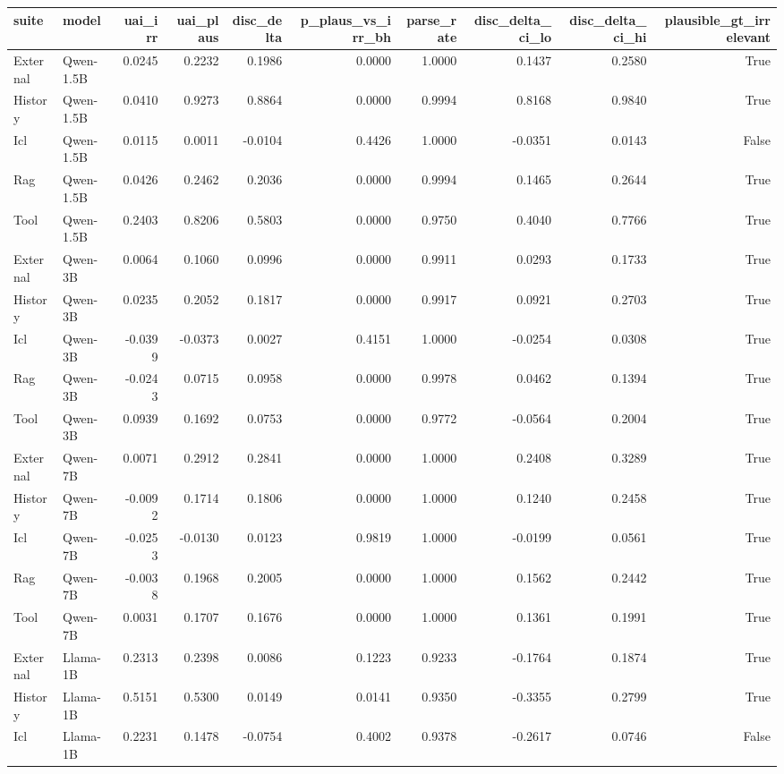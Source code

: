 \begin{tabular}{llrrrrrrrr}
\toprule
suite & model & uai_irr & uai_plaus & disc_delta & p_plaus_vs_irr_bh & parse_rate & disc_delta_ci_lo & disc_delta_ci_hi & plausible_gt_irrelevant \\
\midrule
External & Qwen-1.5B & 0.0245 & 0.2232 & 0.1986 & 0.0000 & 1.0000 & 0.1437 & 0.2580 & True \\
History & Qwen-1.5B & 0.0410 & 0.9273 & 0.8864 & 0.0000 & 0.9994 & 0.8168 & 0.9840 & True \\
Icl & Qwen-1.5B & 0.0115 & 0.0011 & -0.0104 & 0.4426 & 1.0000 & -0.0351 & 0.0143 & False \\
Rag & Qwen-1.5B & 0.0426 & 0.2462 & 0.2036 & 0.0000 & 0.9994 & 0.1465 & 0.2644 & True \\
Tool & Qwen-1.5B & 0.2403 & 0.8206 & 0.5803 & 0.0000 & 0.9750 & 0.4040 & 0.7766 & True \\
External & Qwen-3B & 0.0064 & 0.1060 & 0.0996 & 0.0000 & 0.9911 & 0.0293 & 0.1733 & True \\
History & Qwen-3B & 0.0235 & 0.2052 & 0.1817 & 0.0000 & 0.9917 & 0.0921 & 0.2703 & True \\
Icl & Qwen-3B & -0.0399 & -0.0373 & 0.0027 & 0.4151 & 1.0000 & -0.0254 & 0.0308 & True \\
Rag & Qwen-3B & -0.0243 & 0.0715 & 0.0958 & 0.0000 & 0.9978 & 0.0462 & 0.1394 & True \\
Tool & Qwen-3B & 0.0939 & 0.1692 & 0.0753 & 0.0000 & 0.9772 & -0.0564 & 0.2004 & True \\
External & Qwen-7B & 0.0071 & 0.2912 & 0.2841 & 0.0000 & 1.0000 & 0.2408 & 0.3289 & True \\
History & Qwen-7B & -0.0092 & 0.1714 & 0.1806 & 0.0000 & 1.0000 & 0.1240 & 0.2458 & True \\
Icl & Qwen-7B & -0.0253 & -0.0130 & 0.0123 & 0.9819 & 1.0000 & -0.0199 & 0.0561 & True \\
Rag & Qwen-7B & -0.0038 & 0.1968 & 0.2005 & 0.0000 & 1.0000 & 0.1562 & 0.2442 & True \\
Tool & Qwen-7B & 0.0031 & 0.1707 & 0.1676 & 0.0000 & 1.0000 & 0.1361 & 0.1991 & True \\
External & Llama-1B & 0.2313 & 0.2398 & 0.0086 & 0.1223 & 0.9233 & -0.1764 & 0.1874 & True \\
History & Llama-1B & 0.5151 & 0.5300 & 0.0149 & 0.0141 & 0.9350 & -0.3355 & 0.2799 & True \\
Icl & Llama-1B & 0.2231 & 0.1478 & -0.0754 & 0.4002 & 0.9378 & -0.2617 & 0.0746 & False \\

\end{tabular}
